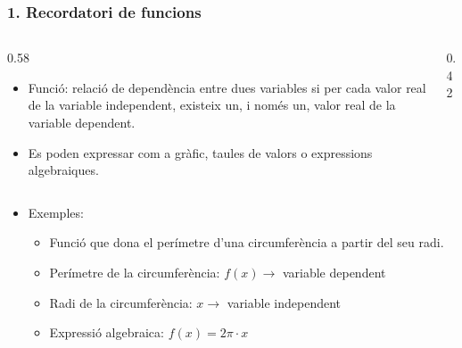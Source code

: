 \documentclass[aspectratio=169]{beamer}
\begin{document}
\begin{frame}
  \frametitle{1. Recordatori de funcions}

  \begin{columns}[T]
    \begin{column}{0.58\textwidth}
      \begin{itemize}
        \item<1-> Funció: relació de dependència entre dues variables si per cada valor real de la variable independent, existeix un, i només un, valor real de la variable dependent.
        \item<2-> Es poden expressar com a gràfic, taules de valors o expressions algebraiques.
      \end{itemize}
    \end{column}

    \begin{column}{0.42\textwidth}
      \vspace{-0.3cm}
    \end{column}
  \end{columns}

  \vspace{0.3cm}
  \begin{itemize}
    \item<5-> Exemples:
    \begin{itemize}
      \item<6-> Funció que dona el perímetre d'una circumferència a partir del seu radi.
      \item<7-> Perímetre de la circumferència: \(f(x) \to\) variable dependent
      \item<8-> Radi de la circumferència: \(x \to\) variable independent
      \item<9-> Expressió algebraica: \(f(x) = 2\pi \cdot x\)
    \end{itemize}
  \end{itemize}
\end{frame}
\end{document}
